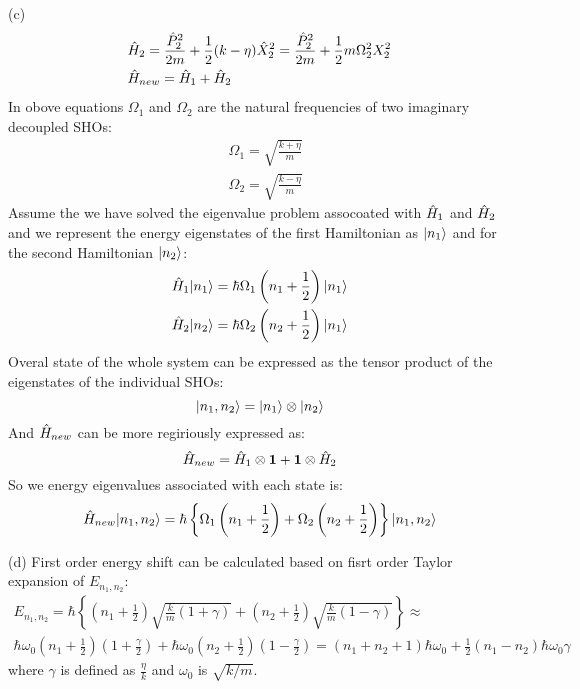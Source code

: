 \begin{homeworkProblem}
\begin{homeworkSection}{(c)}
\begin{align}
&\Hat{H}_2=\frac{\Hat{P}_2^2}{2m}+\frac{1}{2}(k-\eta)\Hat{X}_2^2=\frac{\Hat{P}_2^2}{2m}+\frac{1}{2}m\Omega_2^2 X_2^2\\
&\Hat{H}_{new}=\Hat{H}_1+\Hat{H}_2
\end{align}
In obove equations $\Omega_1$ and $\Omega_2$ are the natural frequencies of two imaginary decoupled SHOs:
\begin{align}
&\Omega_1=\sqrt{\frac{k+\eta}{m}}\\
&\Omega_2=\sqrt{\frac{k-\eta}{m}}
\end{align}
Assume the we have solved the eigenvalue problem assocoated with $\Hat{H}_1$ and $\Hat{H}_2$ and we represent the energy eigenstates of the first Hamiltonian as $|n_1\rangle$ and for the second Hamiltonian $|n_2\rangle$:
\begin{align}
\Hat{H}_1|n_1\rangle&=\hbar\Omega_1\left(n_1+\frac{1}{2}\right)|n_1\rangle\\
\Hat{H}_2|n_2\rangle&=\hbar\Omega_2\left(n_2+\frac{1}{2}\right)|n_1\rangle
\end{align} 
Overal state of the whole system can be expressed as the tensor product of the eigenstates of the individual SHOs:
\begin{equation*}
|n_1,n_2\rangle=|n_1\rangle\otimes|n_2\rangle
\end{equation*} 
And $\Hat{H}_{new}$ can be more regiriously expressed as:
\begin{equation*}
\Hat{H}_{new}=\Hat{H}_1\otimes\mathbf{1}+\mathbf{1}\otimes\Hat{H}_2
\end{equation*} 
So we energy eigenvalues associated with each state is:
\begin{equation}
\Hat{H}_{new}|n_1,n_2\rangle=\hbar\left\{\Omega_1\left(n_1+\frac{1}{2}\right)+\Omega_2\left(n_2+\frac{1}{2}\right)\right\}|n_1,n_2\rangle
\end{equation} 
\end{homeworkSection}
\begin{homeworkSection}{(d)}
First order energy shift can be calculated based on fisrt order Taylor expansion of $E_{n_1,n_2}$:
\begin{multline}
E_{n_1,n_2}=\hbar\left\{\left(n_1+\frac{1}{2}\right)\sqrt{\frac{k}{m}(1+\gamma)}
+\left(n_2+\frac{1}{2}\right)\sqrt{\frac{k}{m}(1-\gamma)}\right\}
\approx\\
\hbar\omega_0\left(n_1+\frac{1}{2}\right)\left(1+\frac{\gamma}{2}\right)+\hbar\omega_0\left(n_2+\frac{1}{2}\right)\left(1-\frac{\gamma}{2}\right)=\left(n_1+n_2+1\right)\hbar\omega_0+\frac{1}{2}\left(n_1-n_2\right)\hbar\omega_0\gamma
\end{multline}
where $\gamma$ is defined as $\frac{\eta}{k}$ and $\omega_0$ is $\sqrt{k/m}$. 
\end{homeworkSection}

\end{homeworkProblem}